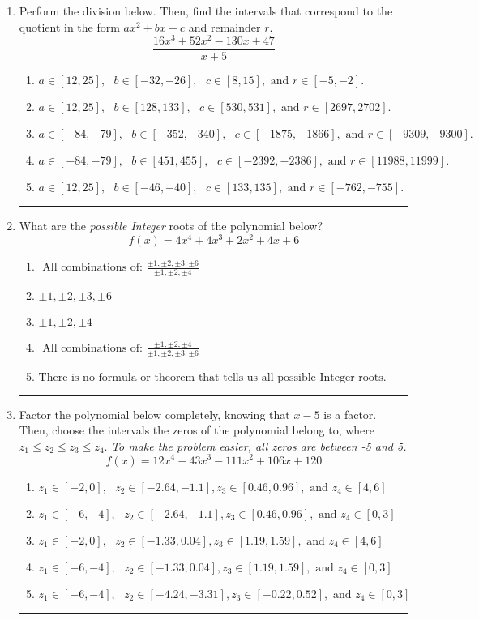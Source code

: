 \documentclass[14pt]{extbook}
\newcommand{\litem}[1]{\item#1\hspace*{-1cm}\rule{\textwidth}{0.4pt}}
\begin{document}
\begin{enumerate}
\litem{
Perform the division below. Then, find the intervals that correspond to the quotient in the form $ax^2+bx+c$ and remainder $r$.\[ \frac{16x^{3} +52 x^{2} -130 x + 47}{x + 5} \]\begin{enumerate}[label=\Alph*.]
\item \( a \in [12, 25], \text{   } b \in [-32, -26], \text{   } c \in [8, 15], \text{   and   } r \in [-5, -2]. \)
\item \( a \in [12, 25], \text{   } b \in [128, 133], \text{   } c \in [530, 531], \text{   and   } r \in [2697, 2702]. \)
\item \( a \in [-84, -79], \text{   } b \in [-352, -340], \text{   } c \in [-1875, -1866], \text{   and   } r \in [-9309, -9300]. \)
\item \( a \in [-84, -79], \text{   } b \in [451, 455], \text{   } c \in [-2392, -2386], \text{   and   } r \in [11988, 11999]. \)
\item \( a \in [12, 25], \text{   } b \in [-46, -40], \text{   } c \in [133, 135], \text{   and   } r \in [-762, -755]. \)

\end{enumerate} }
\litem{
What are the \textit{possible Integer} roots of the polynomial below?\[ f(x) = 4x^{4} +4 x^{3} +2 x^{2} +4 x + 6 \]\begin{enumerate}[label=\Alph*.]
\item \( \text{ All combinations of: }\frac{\pm 1,\pm 2,\pm 3,\pm 6}{\pm 1,\pm 2,\pm 4} \)
\item \( \pm 1,\pm 2,\pm 3,\pm 6 \)
\item \( \pm 1,\pm 2,\pm 4 \)
\item \( \text{ All combinations of: }\frac{\pm 1,\pm 2,\pm 4}{\pm 1,\pm 2,\pm 3,\pm 6} \)
\item \( \text{There is no formula or theorem that tells us all possible Integer roots.} \)

\end{enumerate} }
\litem{
Factor the polynomial below completely, knowing that $x-5$ is a factor. Then, choose the intervals the zeros of the polynomial belong to, where $z_1 \leq z_2 \leq z_3 \leq z_4$. \textit{To make the problem easier, all zeros are between -5 and 5.}\[ f(x) = 12x^{4} -43 x^{3} -111 x^{2} +106 x + 120 \]\begin{enumerate}[label=\Alph*.]
\item \( z_1 \in [-2, 0], \text{   }  z_2 \in [-2.64, -1.1], z_3 \in [0.46, 0.96], \text{   and   } z_4 \in [4, 6] \)
\item \( z_1 \in [-6, -4], \text{   }  z_2 \in [-2.64, -1.1], z_3 \in [0.46, 0.96], \text{   and   } z_4 \in [0, 3] \)
\item \( z_1 \in [-2, 0], \text{   }  z_2 \in [-1.33, 0.04], z_3 \in [1.19, 1.59], \text{   and   } z_4 \in [4, 6] \)
\item \( z_1 \in [-6, -4], \text{   }  z_2 \in [-1.33, 0.04], z_3 \in [1.19, 1.59], \text{   and   } z_4 \in [0, 3] \)
\item \( z_1 \in [-6, -4], \text{   }  z_2 \in [-4.24, -3.31], z_3 \in [-0.22, 0.52], \text{   and   } z_4 \in [0, 3] \)


\end{enumerate}}
\end{enumerate}
\end{document}
